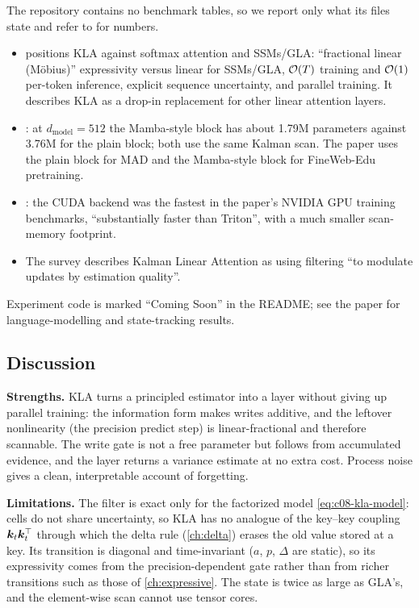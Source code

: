 \begin{results}
The repository contains no benchmark tables, so we report only what its files state and refer to
\citet{shaj2026kalman} for numbers.
\begin{itemize}
  \item {} positions KLA against
  softmax attention and SSMs/GLA: ``fractional linear (M\"obius)'' expressivity versus linear for
  SSMs/GLA, $\mathcal{O}(T)$ training and $\mathcal{O}(1)$ per-token inference, explicit sequence uncertainty,
  and parallel training. It describes KLA as a drop-in replacement for other linear attention layers.
  \item {}: at $d_\text{model}=512$
  the Mamba-style block has about 1.79M parameters against 3.76M for the plain block; both use the
  same Kalman scan. The paper uses the plain block for MAD and the Mamba-style block for FineWeb-Edu
  pretraining.
  \item {}: the CUDA backend
  was the fastest in the paper's NVIDIA GPU training benchmarks, ``substantially faster than
  Triton'', with a much smaller scan-memory footprint.
  \item The survey \citep{zhoubian2026memory} describes Kalman Linear Attention as using filtering
  ``to modulate updates by estimation quality''.
\end{itemize}
Experiment code is marked ``Coming Soon'' in the README; see the paper for language-modelling and
state-tracking results.
\end{results}

\subsection{Discussion}

\textbf{Strengths.} KLA turns a principled estimator into a layer without giving up parallel
training: the information form makes writes additive, and the leftover nonlinearity (the precision
predict step) is linear-fractional and therefore scannable. The write gate is not a free parameter
but follows from accumulated evidence, and the layer returns a variance estimate at no extra
cost. Process noise gives a clean, interpretable account of forgetting.

\textbf{Limitations.} The filter is exact only for the factorized model \eqref{eq:c08-kla-model}:
cells do not share uncertainty, so KLA has no analogue of the key--key coupling
$\bm{k}_t\bm{k}_t^{\top}$ through which the delta rule (\cref{ch:delta}) erases the old value stored at a
key. Its transition is diagonal and time-invariant ($a$, $p$, $\Delta$ are static), so its
expressivity comes from the precision-dependent gate rather than from richer transitions such as
those of \cref{ch:expressive}. The state is twice as large as GLA's, and the element-wise scan
cannot use tensor cores.

